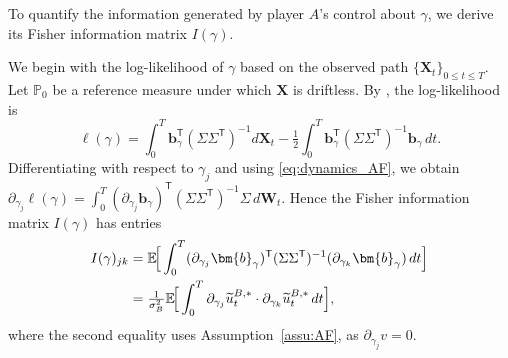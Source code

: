 \documentclass[letterpaper, 10 pt, conference]{ieeeconf}
\newcommand{\Prob}{\mathbb P}
\newcommand{\E}{\mathbb E}
\newcommand{\transpose}{^\mathsf{T}}
\newcommand{\dr}[1]{\textcolor{red}{\textsf{[DR: #1]}}}
\begin{document}
To quantify the information generated by player $A$'s control about $\gamma$, we derive its Fisher information matrix $I(\gamma)$. 

We begin with the log-likelihood of $\gamma$ based on the observed path $\{\bm{X}_t\}_{0 \leq t \leq T}$. Let \(\Prob_0\) be a reference measure under which \(\bm X\) is driftless. By \cite[Theorem 1.12]{kutoyants2013statistical}, %
 the log-likelihood is
\begin{equation*}
    \ell(\gamma) = \int_0^T \bm{b}_{\gamma}\transpose (\Sigma\Sigma\transpose)^{-1} d\bm{X}_t - \tfrac{1}{2}\int_0^T \bm{b}_{\gamma}\transpose (\Sigma\Sigma\transpose)^{-1} \bm{b}_{\gamma} \, dt.
\end{equation*}
Differentiating with respect to $\gamma_j$ and using \eqref{eq:dynamics_AF}, we obtain $\partial_{\gamma_j} \ell(\gamma) = \int_0^T (\partial_{\gamma_j} \bm{b}_{\gamma})\transpose (\Sigma\Sigma\transpose)^{-1} \Sigma \, d\bm{W}_t$.
Hence the Fisher information matrix $I(\gamma)$ has entries
\begin{align*}
    I(\gamma)_{jk} &= \E\!\Big[\int_0^T (\partial_{\gamma_j} \bm{b}_{\gamma})\transpose (\Sigma\Sigma\transpose)^{-1} (\partial_{\gamma_k} \bm{b}_{\gamma}) \, dt\Big] \notag \\
    &= \tfrac{1}{\sigma_B^2} \E\!\Big[\int_0^T \partial_{\gamma_j} \widetilde{u}^{B,*}_t \cdot \partial_{\gamma_k} \widetilde{u}^{B,*}_t \, dt\Big],
\end{align*}
where the second equality uses Assumption~\ref{assu:AF}, as $\partial_{\gamma_j} v = 0$.
\end{document}
